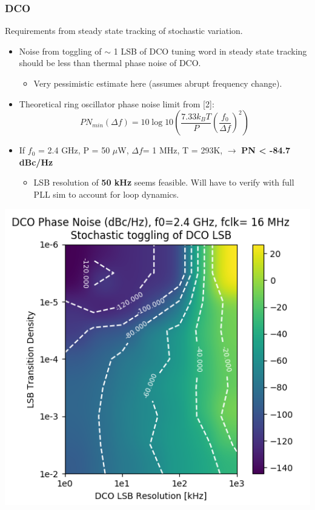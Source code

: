 \documentclass[t, screen, aspectratio=43]{beamer}
\begin{document}
\begin{frame}
	\frametitle{DCO}
	\begin{block}{Requirements from steady state tracking of stochastic variation.}
		\begin{minipage}{7cm}
			\vspace{1em}
			\begin{itemize}
				\scriptsize
				\item Noise from toggling of $\sim$ 1 LSB of DCO tuning word in steady state tracking should be less than thermal phase noise of DCO.
				\begin{itemize}
					\scriptsize			
					\item Very pessimistic estimate here (assumes abrupt frequency change).
				\end{itemize} 
				\item Theoretical ring oscillator phase noise limit from [2]:
				\tiny
				\begin{equation}
					PN_{min}(\Delta f)= 10\log 10\left(\frac{7.33k_BT}{P}\left(\frac{f_0}{\Delta f}\right)^2\right)
				\end{equation}
				\scriptsize
				\item If $f_0$ = 2.4 GHz, P = 50 $\mu$W, $\Delta f$= 1 MHz, T = 293K, $\rightarrow$ \textbf{PN < -84.7 dBc/Hz}
				\begin{itemize}
					\scriptsize			
					\item LSB resolution of \textbf{50 kHz} seems feasible. Will have to verify with full PLL sim to account for loop dynamics.
				\end{itemize} 
			\end{itemize}  
		\end{minipage}%
		\begin{minipage}{5cm}
			\includegraphics[width=1\textwidth, angle=0]{lsb_stochastic_pn.png}

\end{minipage}
\end{block}
\end{frame}
\end{document}
